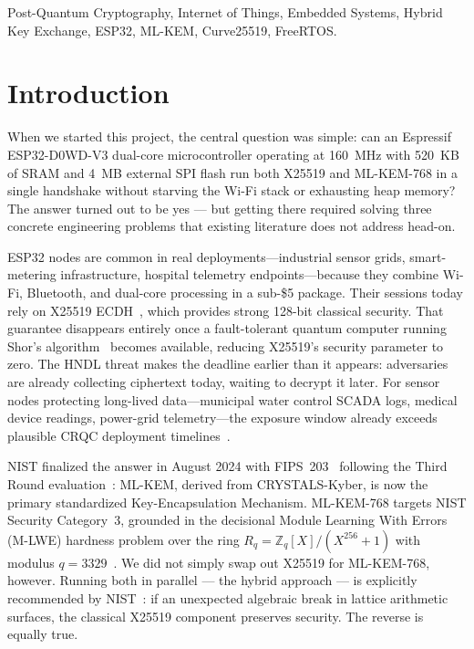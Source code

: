 \documentclass[journal, 10pt]{IEEEtran}
\begin{document}
\begin{IEEEkeywords}
Post-Quantum Cryptography, Internet of Things, Embedded Systems, Hybrid Key Exchange, ESP32, ML-KEM, Curve25519, FreeRTOS.
\end{IEEEkeywords}

\section{Introduction}
When we started this project, the central question was simple: can an Espressif ESP32-D0WD-V3 dual-core microcontroller operating at 160~MHz with 520~KB of SRAM and 4~MB external SPI flash run both X25519 and ML-KEM-768 in a single handshake without starving the Wi-Fi stack or exhausting heap memory? The answer turned out to be yes — but getting there required solving three concrete engineering problems that existing literature does not address head-on.

ESP32 nodes are common in real deployments—industrial sensor grids, smart-metering infrastructure, hospital telemetry endpoints—because they combine Wi-Fi, Bluetooth, and dual-core processing in a sub-\$5 package. Their sessions today rely on X25519 ECDH~\cite{b5}, which provides strong 128-bit classical security. That guarantee disappears entirely once a fault-tolerant quantum computer running Shor's algorithm~\cite{b1} becomes available, reducing X25519's security parameter to zero. The HNDL threat makes the deadline earlier than it appears: adversaries are already collecting ciphertext today, waiting to decrypt it later. For sensor nodes protecting long-lived data—municipal water control SCADA logs, medical device readings, power-grid telemetry—the exposure window already exceeds plausible CRQC deployment timelines~\cite{b10,b39}.

NIST finalized the answer in August 2024 with FIPS~203~\cite{b2} following the Third Round evaluation~\cite{b15}: ML-KEM, derived from CRYSTALS-Kyber, is now the primary standardized Key-Encapsulation Mechanism. ML-KEM-768 targets NIST Security Category~3, grounded in the decisional Module Learning With Errors (M-LWE) hardness problem over the ring $R_q = \mathbb{Z}_q[X]/(X^{256}+1)$ with modulus $q = 3329$~\cite{b27}. We did not simply swap out X25519 for ML-KEM-768, however. Running both in parallel — the hybrid approach — is explicitly recommended by NIST~\cite{b9}: if an unexpected algebraic break in lattice arithmetic surfaces, the classical X25519 component preserves security. The reverse is equally true.
\end{document}

